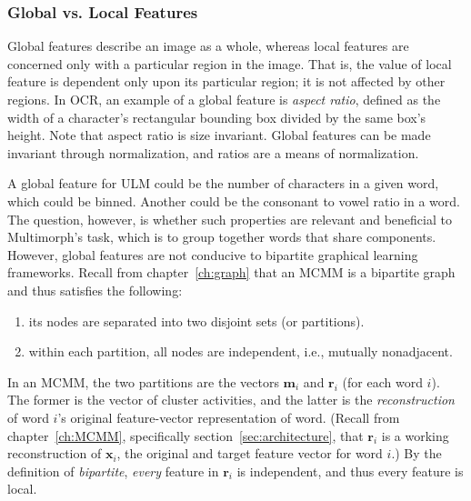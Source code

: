
\subsubsection{Global vs. Local Features}
Global features describe an image as a whole, whereas local features are concerned
only with a particular region in the image. That is, the value of local feature is dependent
only upon its particular region; it is not affected by other regions. 
In OCR, an example of a global feature is \emph{aspect ratio}, defined 
as the width of a character's rectangular bounding box divided by the same 
box's height. Note that aspect ratio is size invariant. Global features 
can be made invariant 
through normalization, and ratios are a means of normalization.

A global feature for ULM could be the number 
of characters in a given word, which could be binned. Another 
could be the consonant to vowel ratio in a word. The question, however, is 
whether such properties are relevant and beneficial to Multimorph's task,
which is to group together words that share components.
However, global features are not conducive to bipartite graphical learning frameworks.
Recall from chapter~\ref{ch:graph} that an MCMM is a bipartite graph and thus 
satisfies the following:
\begin{enumerate}
\item its nodes are separated into two disjoint sets (or partitions).
\item within each partition, all nodes are independent, i.e., mutually 
nonadjacent.
\end{enumerate}
In an MCMM, the two partitions are the vectors $\textbf{m}_{i}$
and $\textbf{r}_{i}$ (for each word $i$). The former is the vector of cluster activities, and the latter
is the \emph{reconstruction} of word $i$'s original feature-vector representation of word. (Recall from chapter~\ref{ch:MCMM}, specifically section~\ref{sec:architecture}, that $\textbf{r}_i$ is a working
reconstruction of $\textbf{x}_i$, the original and target feature vector for word $i$.)
By the definition of \emph{bipartite}, \emph{every} feature in $\textbf{r}_i$ is independent,
and thus every feature is local. 

